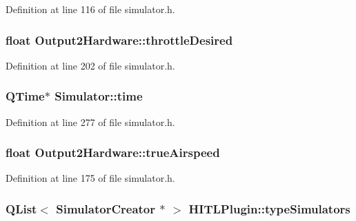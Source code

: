 \-Definition at line 116 of file simulator.\-h.

\hypertarget{group___h_i_t_l_plugin_gab6902f4f38e771b9d499521d861661f2}{
\subsubsection[{throttle\-Desired}]{\setlength{\rightskip}{0pt plus 5cm}float {\bf \-Output2\-Hardware\-::throttle\-Desired}}}\label{group___h_i_t_l_plugin_gab6902f4f38e771b9d499521d861661f2}


\-Definition at line 202 of file simulator.\-h.

\hypertarget{group___h_i_t_l_plugin_ga162228fbfec7737c989bfe0b340e8617}{
\subsubsection[{time}]{\setlength{\rightskip}{0pt plus 5cm}\-Q\-Time$\ast$ {\bf \-Simulator\-::time}}}\label{group___h_i_t_l_plugin_ga162228fbfec7737c989bfe0b340e8617}


\-Definition at line 277 of file simulator.\-h.

\hypertarget{group___h_i_t_l_plugin_gaca71e282fd00490c801905254e99ef54}{
\subsubsection[{true\-Airspeed}]{\setlength{\rightskip}{0pt plus 5cm}float {\bf \-Output2\-Hardware\-::true\-Airspeed}}}\label{group___h_i_t_l_plugin_gaca71e282fd00490c801905254e99ef54}


\-Definition at line 175 of file simulator.\-h.

\hypertarget{group___h_i_t_l_plugin_ga0400c2f74f4a0c3cd840f95c99b1b601}{
\subsubsection[{type\-Simulators}]{\setlength{\rightskip}{0pt plus 5cm}\-Q\-List$<$ {\bf \-Simulator\-Creator} $\ast$ $>$ {\bf \-H\-I\-T\-L\-Plugin\-::type\-Simulators}}}\label{group___h_i_t_l_plugin_ga0400c2f74f4a0c3cd840f95c99b1b601}


